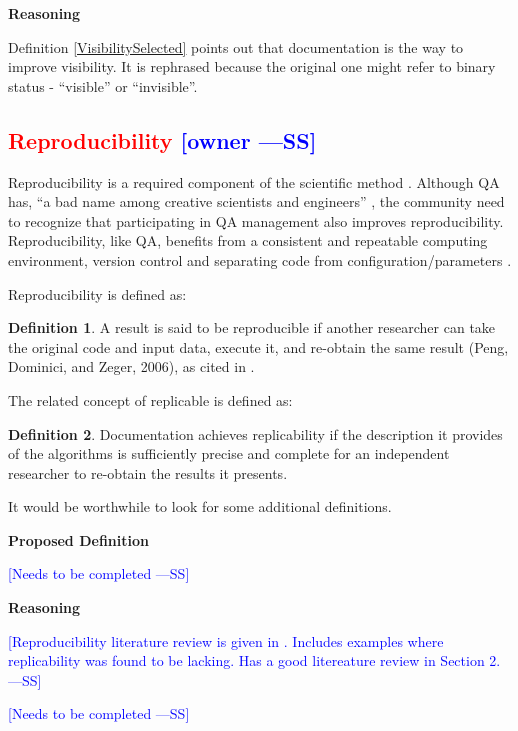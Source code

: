 \documentclass[letterpaper,cleveref]{lipics-v2019}
\newcommand{\authornote}[3]{\textcolor{#1}{[#3 ---#2]}}
\newcommand{\authornote}[3]{}
\newcommand{\wss}[1]{\authornote{blue}{SS}{#1}} %
\newcommand{\notdone}[1]{\textcolor{red}{#1}}
\theoremstyle{definition}
\newtheorem{defn}{Definition}
\begin{document}
\noindent \textbf{Reasoning}

Definition \ref{VisibilitySelected} points out that documentation is the way to
improve visibility. It is rephrased because the original one might refer to
binary status - ``visible'' or ``invisible''.

\subsection{\notdone{Reproducibility} \wss{owner}}

Reproducibility is a required component of the scientific method
\citep{Davison2012}.  Although QA has, ``a bad name among creative scientists
and engineers'' \citep[p.~352]{Roache1998}, the community need to recognize that
participating in QA management also improves reproducibility.  Reproducibility,
like QA, benefits from a consistent and repeatable computing environment,
version control and separating code from configuration/parameters
\citep{Davison2012}.

Reproducibility is defined as:

\begin{defn}
  A result is said to be reproducible if another researcher can take the
  original code and input data, execute it, and re-obtain the same result (Peng,
  Dominici, and Zeger, 2006), as cited in \citet{BenureauAndRougier2017}.
\end{defn}

The related concept of replicable is defined as:

\begin{defn}
  Documentation achieves replicability if the description it provides of the
  algorithms is sufficiently precise and complete for an independent researcher
  to re-obtain the results it presents.  \citep{BenureauAndRougier2017}
\end{defn}

It would be worthwhile to look for some additional definitions.

\noindent \textbf{Proposed Definition} 

\wss{Needs to be completed}

\noindent \textbf{Reasoning}

\wss{Reproducibility literature review is given in \citet{FeinbergEtAl2020}.
  Includes examples where replicability was found to be lacking.  Has a good
  litereature review in Section 2.}

\wss{Needs to be completed}
\end{document}
